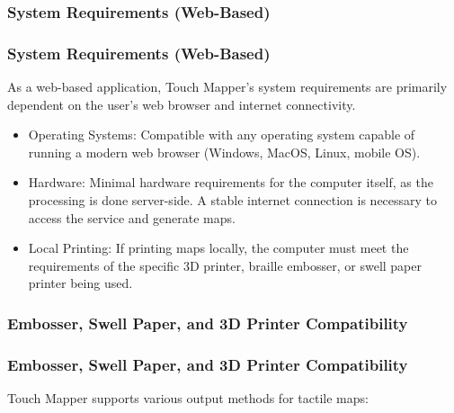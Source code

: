 \subsubsection{System Requirements (Web-Based)}

\subsubsection{System Requirements (Web-Based)}

As a web-based application, Touch Mapper's system requirements are primarily dependent on the user's web browser and internet connectivity.

\begin{itemize}
    \item Operating Systems: Compatible with any operating system capable of running a modern web browser (Windows, MacOS, Linux, mobile OS). \cite{AELData,NYUWorkflow,Ability2AccessTSS}
    \item Hardware: Minimal hardware requirements for the computer itself, as the processing is done server-side. A stable internet connection is necessary to access the service and generate maps. \cite{AELData,NYUWorkflow,Ability2AccessTSS}
    \item Local Printing: If printing maps locally, the computer must meet the requirements of the specific 3D printer, braille embosser, or swell paper printer being used.
\end{itemize}

\subsubsection{Embosser, Swell Paper, and 3D Printer Compatibility}

\subsubsection{Embosser, Swell Paper, and 3D Printer Compatibility}

Touch Mapper supports various output methods for tactile maps:

